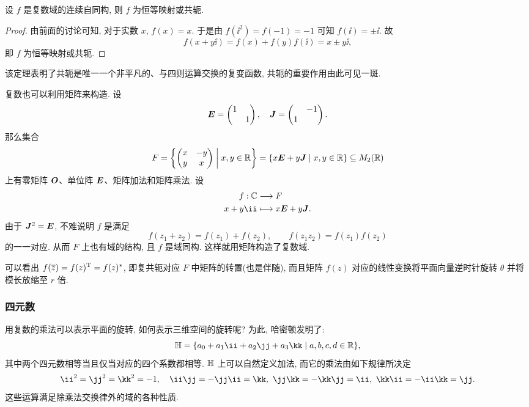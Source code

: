 \begin{theorem}
  设 $f$ 是复数域的连续自同构, 则 $f$ 为恒等映射或共轭.
\end{theorem}

\begin{proof}
  由前面的讨论可知, 对于实数 $x$, $f(x)=x$.
  于是由 $f(\ii^2)=f(-1)=-1$ 可知 $f(\ii)=\pm\ii$.
  故
  \[
    f(x+y\ii)=f(x)+f(y)f(\ii)=x\pm y\ii,
  \]
  即 $f$ 为恒等映射或共轭.
\end{proof}

该定理表明了共轭是唯一一个非平凡的、与四则运算交换的复变函数, 共轭的重要作用由此可见一斑.

复数也可以利用矩阵来构造.
设
\[
  {\boldsymbol{E}}=\begin{pmatrix}1& \\&1\end{pmatrix},\quad
  {\boldsymbol{J}}=\begin{pmatrix}&-1\\1&\end{pmatrix}.
\]
那么集合
\[
  F={\left\{\begin{pmatrix}
    x&-y\\y&x
  \end{pmatrix}\mathrel{\bigg|}x,y\in{\mathbb{R}}\right\}}
  ={\left\{x{\boldsymbol{E}}+y{\boldsymbol{J}}\mid x,y\in{\mathbb{R}}\right\}}\subseteq M_2({\mathbb{R}})
\]
上有零矩阵 ${\boldsymbol{O}}$、单位阵 ${\boldsymbol{E}}$、矩阵加法和矩阵乘法.
设
\begin{align*}
  f:\BC&\lra F\\
  x+y\ii&\lto x\bfE+y\bfJ.
\end{align*}
由于 ${\boldsymbol{J}}^2={\boldsymbol{E}}$, 不难说明 $f$ 是满足
\[
  f(z_1+z_2)=f(z_1)+f(z_2),\qquad
  f(z_1z_2)=f(z_1)f(z_2)
\]
的一一对应.
从而 $F$ 上也有域的结构, 且 $f$ 是域同构.
这样就用矩阵构造了复数域.

可以看出 $f(\overline z)=f(z)^{\mathrm{T}}=f(z)^*$, 即复共轭对应 $F$ 中矩阵的转置(也是伴随), 而且矩阵 $f(z)$ 对应的线性变换将平面向量逆时针旋转 $\theta$ 并将模长放缩至 $r$ 倍.


\subsubsection{四元数}
\label{sssec:quaternion-number}

用复数的乘法可以表示平面的旋转, 如何表示三维空间的旋转呢?
为此, 哈密顿发明了:
\[
  \BH=\{a_0+a_1\ii+a_2\jj+a_3\kk\mid a,b,c,d\in\BR\},
\]
其中两个四元数相等当且仅当对应的四个系数都相等.
${\mathbb{H}}$ 上可以自然定义加法, 而它的乘法由如下规律所决定
\[
  \ii^2=\jj^2=\kk^2=-1,\quad 
  \ii\jj=-\jj\ii=\kk,\ 
  \jj\kk=-\kk\jj=\ii,\ 
  \kk\ii=-\ii\kk=\jj.
\]
这些运算满足除乘法交换律外的域的各种性质.

